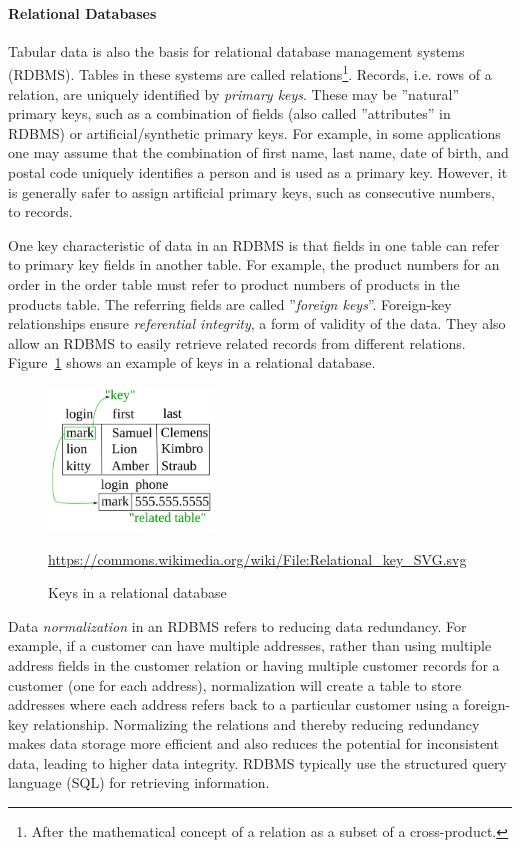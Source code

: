 \paragraph*{Relational Databases}

Tabular data is also the basis for relational database management systems (RDBMS). Tables in these systems are called relations\footnote{After the mathematical concept of a relation as a subset of a cross-product.}. Records, i.e. rows of a relation, are uniquely identified by \emph{primary keys}. These may be ''natural'' primary keys, such as a combination of fields (also called ''attributes'' in RDBMS) or artificial/synthetic primary keys. For example, in some applications one may assume that the combination of first name, last name, date of birth, and postal code uniquely identifies a person and is used as a primary key. However, it is generally safer to assign artificial primary keys, such as consecutive numbers, to records. 

One key characteristic of data in an RDBMS is that fields in one table can refer to primary key fields in another table. For example, the product numbers for an order in the order table must refer to product numbers of products in the products table. The referring fields are called ''\emph{foreign keys}''. Foreign-key relationships ensure \emph{referential integrity}, a form of validity of the data. They also allow an RDBMS to easily retrieve related records from different relations. Figure~\ref{fig:relationkeys} shows an example of keys in a relational database.

\begin{figure}
\centering
\includegraphics[height=1.5in]{Relational_key.png}

\scriptsize{\url{https://commons.wikimedia.org/wiki/File:Relational_key_SVG.svg}}
\caption{Keys in a relational database}
\label{fig:relationkeys}
\end{figure}

Data \emph{normalization} in an RDBMS refers to reducing data redundancy. For example, if a customer can have multiple addresses, rather than using multiple address fields in the customer relation or having multiple customer records for a customer (one for each address), normalization will create a table to store addresses where each address refers back to a particular customer using a foreign-key relationship. Normalizing the relations and thereby reducing redundancy makes data storage more efficient and also reduces the potential for inconsistent data, leading to higher data integrity. RDBMS typically use the structured query language (SQL) for retrieving information. 

